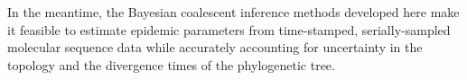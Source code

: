 \documentclass[12pt,titlepage]{article}
\newcommand{\stochCoalSIR}{stochastic coalescent SIR}
\newcommand{\deterCoalSIR}{deterministic coalescent SIR}
\newcommand{\BDSIR}{BDSIR}
\begin{document}
In the meantime, the Bayesian coalescent inference methods developed here make it feasible to estimate epidemic parameters from time-stamped, serially-sampled molecular sequence data while accurately accounting for uncertainty in the topology and the divergence times of the phylogenetic tree.









\end{document}

